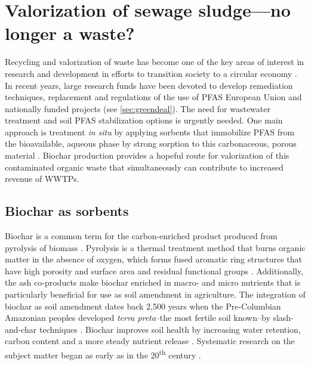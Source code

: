 \section{Valorization of sewage sludge---no longer a waste?}
Recycling and valorization of waste has become one of the key areas of interest in research and development in efforts to transition society to a circular economy \citep{Ahmad2014}. In recent years, large research funds have been devoted to develop remediation techniques, replacement and regulations of the use of PFAS European Union and nationally funded projects (see \cref{sec:greendeal}). The need for wastewater treatment and soil PFAS stabilization options is urgently needed. One main approach is treatment \textit{in situ} by applying sorbents that immobilize PFAS from the bioavailable, aqueous phase by strong sorption to this carbonaceous, porous material \citep{Ahmad2014,Sormo2021,Kupryianchyk2016b}. Biochar production provides a hopeful route for valorization of this contaminated organic waste that simultaneously can contribute to increased revenue of WWTPs.

\subsection{Biochar as sorbents}
Biochar is a common term for the carbon-enriched product produced from pyrolysis of biomass \citep{LehmannAndJoseph2015}. Pyrolysis is a thermal treatment method that burns organic matter in the absence of oxygen, which forms fused aromatic ring structures that have high porosity and surface area and residual functional groups \citep{LehmannAndJoseph2015}. Additionally, the ash co-products make biochar enriched in macro- and micro nutrients that is particularly beneficial for use as soil amendment in agriculture. The integration of biochar as soil amendment dates back 2,500 years when the Pre-Columbian Amazonian peoples developed \textit{terra preta}--the most fertile soil known--by slash-and-char techniques \citep{Tindall2017,Ahmad2014}. Biochar improves soil health by increasing water retention, carbon content and a more steady nutrient release \citeauthor{Ahmad2014}. Systematic research on the subject matter began as early as in the 20\textsuperscript{th} century \citep{Retan1915}. 


